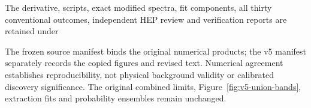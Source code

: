 The derivative, scripts, exact modified spectra, fit components, all thirty conventional outcomes, independent HEP review and verification reports are retained under
\begin{center}\small{}\end{center}
The frozen source manifest binds the original numerical products; the v5 manifest
separately records the copied figures and revised text. Numerical agreement establishes reproducibility, not physical background validity or calibrated discovery significance. The original combined limits, Figure~\ref{fig:v5-union-bands}, extraction fits and probability ensembles remain unchanged.
